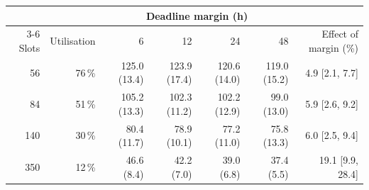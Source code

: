 \begin{tabular}{rrrrrrr}
\toprule
& & \multicolumn{4}{c}{Deadline margin (h)} & \\
\cmidrule(lr){3-6}
Slots & Utilisation & 6 & 12 & 24 & 48 & Effect of margin (\%) \\
\midrule
56 & 76\,\% & 125.0 (13.4) & 123.9 (17.4) & 120.6 (14.0) & 119.0 (15.2) & 4.9 [2.1, 7.7] \\
84 & 51\,\% & 105.2 (13.3) & 102.3 (11.2) & 102.2 (12.9) & 99.0 (13.0) & 5.9 [2.6, 9.2] \\
140 & 30\,\% & 80.4 (11.7) & 78.9 (10.1) & 77.2 (11.0) & 75.8 (13.3) & 6.0 [2.5, 9.4] \\
350 & 12\,\% & 46.6 (8.4) & 42.2 (7.0) & 39.0 (6.8) & 37.4 (5.5) & 19.1 [9.9, 28.4] \\
\bottomrule
\end{tabular}
